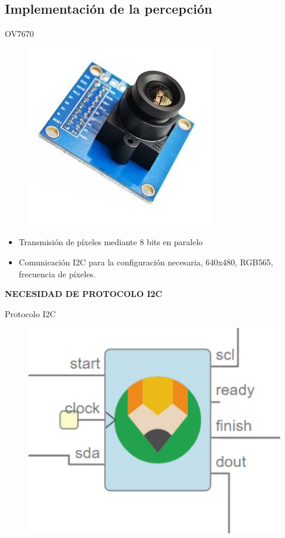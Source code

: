 \documentclass{beamer}
\begin{document}
\subsection{Implementación de la percepción}

\begin{frame}{OV7670}
\begin{figure}[H]
	\center
	\includegraphics[scale=0.35, angle=0]{imagenes/Cuadricoptero_vision/OV7670}
\end{figure}
\begin{block}{}
	\begin{itemize}
		\item Transmisión de píxeles mediante 8 bits en paralelo \pause
		\item Comunicación I2C para la configuración necesaria, 640x480, RGB565, frecuencia de píxeles. \pause
	\end{itemize}
\end{block}
\begin{alertblock}{}
		\centering \textbf{NECESIDAD DE PROTOCOLO I2C} 
\end{alertblock}
\end{frame}

\begin{frame}{Protocolo I2C}
\begin{figure}[H]
	\center
	\includegraphics[scale=0.4, angle=0]{imagenes/Cuadricoptero_vision/I2C_write.PNG}
\end{figure}
\end{frame}
\end{document}

